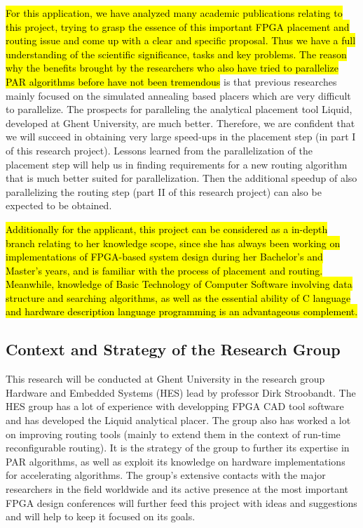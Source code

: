 \documentclass[a4paper,oneside,12pt]{article}
\begin{document}
\hl{For this application, we have analyzed many academic publications relating to this project, trying to grasp the essence of this important FPGA placement and routing issue and come up with a clear and specific proposal. Thus we have a full understanding of the scientific significance, tasks and key problems. The reason why the benefits brought by the researchers who also have tried to parallelize PAR algorithms before have not been tremendous} is that previous researches mainly focused on the simulated annealing based placers which are very difficult to parallelize. The prospects for paralleling the analytical placement tool {\sc Liquid}, developed at Ghent University, are much better. Therefore, we are confident that we will succeed in obtaining very large speed-ups in the placement step (in part I of this research project). Lessons learned from the parallelization of the placement step will help us in finding requirements for a new routing algorithm that is much better suited for parallelization. Then the additional speedup of also parallelizing the routing step (part II of this research project) can also be expected to be obtained.

\hl{Additionally for the applicant, this project can be considered as a in-depth branch relating to her knowledge scope, since she has always been working on implementations of FPGA-based system design during her Bachelor's and Master's years, and is familiar with the process of placement and routing. Meanwhile, knowledge of Basic Technology of Computer Software involving data structure and searching algorithms, as well as the essential ability of C language and hardware description language programming is an advantageous complement.}

\subsection{Context and Strategy of the Research Group}\label{context}
This research will be conducted at Ghent University in the research group Hardware and Embedded Systems (HES) lead by professor Dirk Stroobandt. The HES group has a lot of experience with developping FPGA CAD tool software and has developed the {\sc Liquid} analytical placer. The group also has worked a lot on improving routing tools (mainly to extend them in the context of run-time reconfigurable routing). It is the strategy of the group to further its expertise in PAR algorithms, as well as exploit its knowledge on hardware implementations for accelerating algorithms. The group's extensive contacts with the major researchers in the field worldwide and its active presence at the most important FPGA design conferences will further feed this project with ideas and suggestions and will help to keep it focused on its goals.
\end{document}
